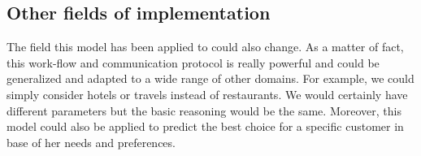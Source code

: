 \documentclass[10pt,a4paper,usenatbib]{article}
\begin{document}
\subsection{Other fields of implementation}
The field this model has been applied to could also change. As a matter of fact, this work-flow and communication protocol is really powerful and could be generalized and adapted to a wide range of other domains. For example, we could simply consider hotels or travels instead of restaurants. We would certainly have different parameters but the basic reasoning would be the same. Moreover, this model could also be applied to predict the best choice for a specific customer in base of her needs and preferences.



\end{document}
